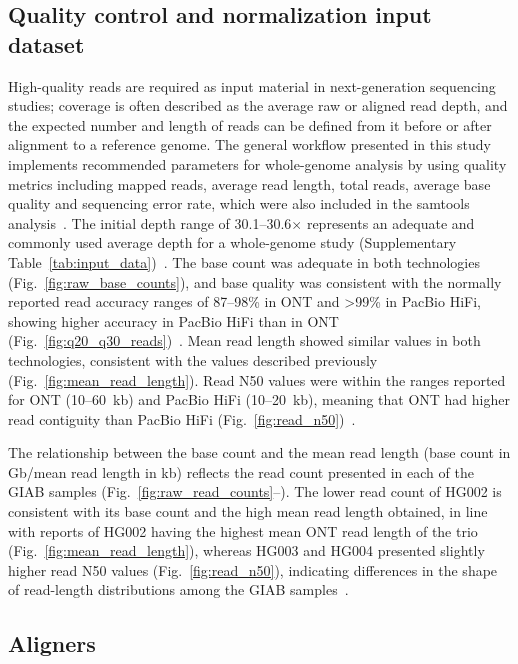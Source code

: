 \documentclass[12pt, letterpaper]{article}
\begin{document}
\subsection{Quality control and normalization input dataset}
High-quality reads are required as input material in next-generation sequencing studies; coverage is often described as the average raw or aligned read depth, and the expected number and length of reads can be defined from it before or after alignment to a reference genome. The general workflow presented in this study implements recommended parameters for whole-genome analysis by using quality metrics including mapped reads, average read length, total reads, average base quality and sequencing error rate, which were also included in the samtools analysis~\cite{Wang2026}. The initial depth range of 30.1--30.6$\times$ represents an adequate and commonly used average depth for a whole-genome study (Supplementary Table~\ref{tab:input_data})~\cite{Sims2014}. The base count was adequate in both technologies (Fig.~\ref{fig:raw_base_counts}), and base quality was consistent with the normally reported read accuracy ranges of 87--98\% in ONT and >99\% in PacBio HiFi, showing higher accuracy in PacBio HiFi than in ONT (Fig.~\ref{fig:q20_q30_reads})~\cite{Logsdon2020}. Mean read length showed similar values in both technologies, consistent with the values described previously (Fig.~\ref{fig:mean_read_length}). Read N50 values were within the ranges reported for ONT (10--60~kb) and PacBio HiFi (10--20~kb), meaning that ONT had higher read contiguity than PacBio HiFi (Fig.~\ref{fig:read_n50})~\cite{Logsdon2020}.

The relationship between the base count and the mean read length (base count in Gb/mean read length in kb) reflects the read count presented in each of the GIAB samples (Fig.~\ref{fig:raw_read_counts}--). The lower read count of HG002 is consistent with its base count and the high mean read length obtained, in line with reports of HG002 having the highest mean ONT read length of the trio (Fig.~\ref{fig:mean_read_length}), whereas HG003 and HG004 presented slightly higher read N50 values (Fig.~\ref{fig:read_n50}), indicating differences in the shape of read-length distributions among the GIAB samples~\cite{Logsdon2020}.

\subsection{Aligners}
\end{document}
